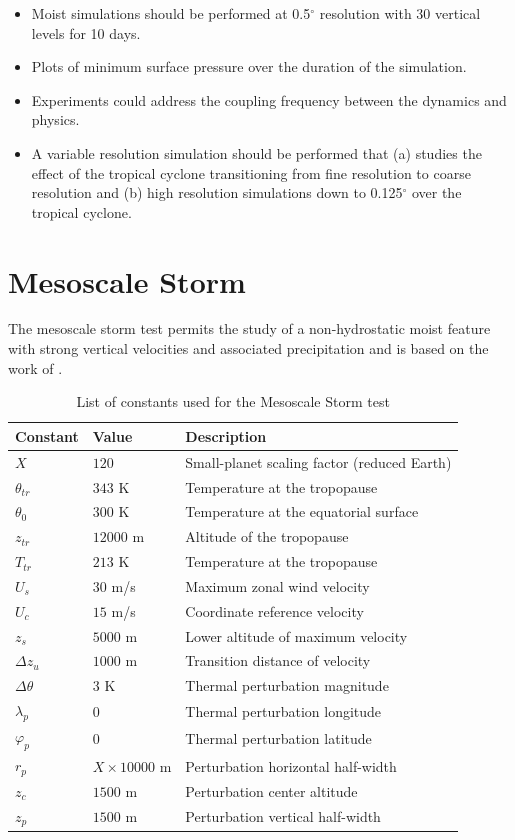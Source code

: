 \documentclass[times,doublespace]{fldauth}
\begin{document}
{\begin{itemize}
\item Moist simulations should be performed at 0.5$^\circ$ resolution with 30 vertical levels for 10 days.
\item Plots of minimum surface pressure over the duration of the simulation.
\item Experiments could address the coupling frequency between the dynamics and physics.
\item A variable resolution simulation should be performed that (a) studies the effect of the tropical cyclone transitioning from fine resolution to coarse resolution and (b) high resolution simulations down to 0.125$^\circ$ over the tropical cyclone.
\end{itemize}


\clearpage

\section{Mesoscale Storm}  \label{sec:mesoscale_storm}

The mesoscale storm test permits the study of a non-hydrostatic moist feature with strong vertical velocities and associated precipitation and is based on the work of \cite{klemp1978simulation}.

\begin{table}[h]

\caption{List of constants used for the Mesoscale Storm test}

\begin{tabular*}{\textwidth}{@{\extracolsep{\fill}}lll}
\hline Constant & Value & Description \\
\hline
$X$ & $120$ & Small-planet scaling factor (reduced Earth)\\
$\theta_{tr}$ & $343$ K & Temperature at the tropopause \\
$\theta_0$ & $300$ K & Temperature at the equatorial surface \\
$z_{tr}$ & $12000$ m & Altitude of the tropopause \\
$T_{tr}$ & $213$ K & Temperature at the tropopause \\
$U_s$ & $30$ m/s & Maximum zonal wind velocity \\
$U_c$ & $15$ m/s & Coordinate reference velocity \\
$z_{s}$ & $5000$ m & Lower altitude of maximum velocity \\
$\Delta z_{u}$ & $1000$ m & Transition distance of velocity \\
$\Delta \theta$ & $3$ K & Thermal perturbation magnitude \\
$\lambda_p$ & $0$ & Thermal perturbation longitude \\
$\varphi_p$ & $0$ & Thermal perturbation latitude \\
$r_p$ & $X \times 10000$ m & Perturbation horizontal half-width \\
$z_{c}$ & $1500$ m & Perturbation center altitude \\
$z_{p}$ & $1500$ m & Perturbation vertical half-width \\
\hline 
\end{tabular*}


\end{table}}
\end{document}

